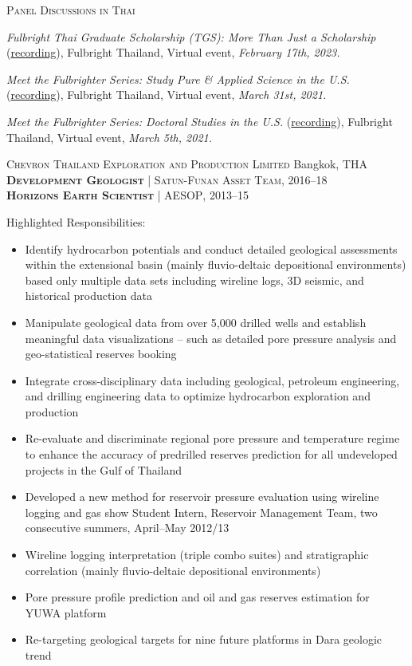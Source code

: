 \documentclass[10pt, letter]{article}
\newcommand{\margintext}[1]{\marginnote{\normalsize\textbf #1 |}}
\begin{document}
\textsc{Panel Discussions in Thai}
\begin{etaremune}
\item \textit{Fulbright Thai Graduate Scholarship (TGS): More Than Just a Scholarship} (\href{https://fb.watch/iLwkVkeNjJ/}{recording}), Fulbright Thailand, Virtual event, \textit{February 17th, 2023.}
\item \textit{Meet the Fulbrighter Series: Study Pure \& Applied Science in the U.S.} (\href{https://www.facebook.com/watch/?v=192470062421053}{recording}), Fulbright Thailand, Virtual event, \textit{March 31st, 2021.}
\item \textit{Meet the Fulbrighter Series: Doctoral Studies in the U.S.} (\href{https://www.facebook.com/watch/?v=1018096972055863}{recording}), Fulbright Thailand, Virtual event,\textit{ March 5th, 2021.} 
\end{etaremune}

\bigskip
\margintext{Professional Experience}
\textsc{Chevron Thailand Exploration and Production Limited} \hfill Bangkok, THA \\
\textsc{\textbf{Development Geologist}} | \textsc{Satun-Funan Asset Team}, 2016–18 \\
\textsc{\textbf{Horizons Earth Scientist}} | \textsc{AESOP}, 2013–15

\bigskip
Highlighted Responsibilities:
\begin{itemize}[leftmargin=*]
    \item Identify hydrocarbon potentials and conduct detailed geological assessments within the extensional basin (mainly fluvio-deltaic depositional environments) based only multiple data sets including wireline logs, 3D seismic, and historical production data
    \item Manipulate geological data from over 5,000 drilled wells and establish meaningful data visualizations – such as detailed pore pressure analysis and geo-statistical reserves booking
    \item Integrate cross-disciplinary data including geological, petroleum engineering, and drilling engineering data to optimize hydrocarbon exploration and production
    \item Re-evaluate and discriminate regional pore pressure and temperature regime to enhance the accuracy of predrilled reserves prediction for all undeveloped projects in the Gulf of Thailand
    \item Developed a new method for reservoir pressure evaluation using wireline logging and gas show
Student Intern, Reservoir Management Team, two consecutive summers, April–May 2012/13
    \item Wireline logging interpretation (triple combo suites) and stratigraphic correlation (mainly fluvio-deltaic depositional environments)
    \item Pore pressure profile prediction and oil and gas reserves estimation for YUWA platform
    \item Re-targeting geological targets for nine future platforms in Dara geologic trend
\end{itemize}
\end{document}
